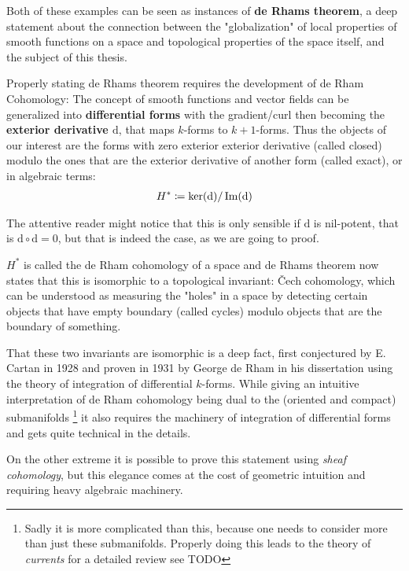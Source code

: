 Both of these examples can be seen as instances of \textbf{de Rhams theorem}, a deep statement about the connection between the "globalization"
of local properties of smooth functions on a space and topological properties of the space itself,
and the subject of this thesis.

Properly stating de Rhams theorem requires the development of de Rham Cohomology: The concept of smooth
functions and vector fields can be generalized into \textbf{differential forms} with the gradient/curl then
becoming the \textbf{exterior derivative $\mathrm{d}$}, that maps $k$-forms to $k+1$-forms. Thus the objects
of our interest are the forms with zero exterior exterior derivative (called closed) modulo the ones that are
the exterior derivative of another form (called exact), or in algebraic terms:
\begin{align*}
	H^* \coloneqq \ker(\mathrm{d}) / \operatorname{Im}(\mathrm{d})
\end{align*}

\begin{remark}
The attentive reader might notice that this is only sensible if $\mathrm{d}$ is nil-potent, that
is $\mathrm{d} \circ \mathrm{d} = 0$, but that is indeed the case, as we are going to proof.
\end{remark}

$H^*$ is called the de Rham cohomology of a space and de Rhams theorem now states that this is
isomorphic to a topological invariant: Čech cohomology, which can be understood as measuring the "holes"
in a space by detecting certain objects that have empty boundary (called cycles) modulo objects that are the
boundary of something.

That these two invariants are isomorphic is a deep fact, first conjectured by E. Cartan in 1928 and
proven in 1931 by George de Rham in his dissertation \cite{de_rham_sur_1931} using the theory of integration
of differential $k$-forms. While giving an intuitive interpretation of de Rham cohomology being dual to the
(oriented and compact) submanifolds
\footnote{
	Sadly it is more complicated than this, because one needs to consider more than just these submanifolds.
	Properly doing this leads to the theory of \textit{currents} for a detailed review see TODO
}
it also requires the machinery of integration of differential forms and gets quite technical in the details.

On the other extreme it is possible to prove this statement using \textit{sheaf cohomology}, but this elegance comes
at the cost of geometric intuition and requiring heavy algebraic machinery.

